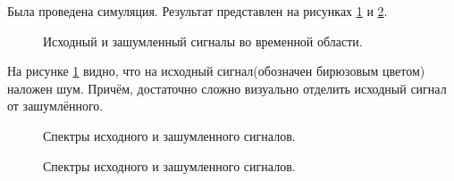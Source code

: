 \documentclass[a4paper,14pt]{extarticle}
\begin{document}
Была проведена симуляция. Результат представлен на рисунках \ref{004} и \ref{005}.

\begin{figure}[H]
\caption{Исходный и зашумленный сигналы во временной области.}
\label{004}
\end{figure}

На рисунке \ref{004} видно, что на исходный сигнал(обозначен бирюзовым цветом) наложен шум. Причём, достаточно сложно визуально отделить исходный сигнал от зашумлённого.

\begin{figure}[H]
\caption{Спектры исходного и зашумленного сигналов.}
\label{005}
\end{figure}

\begin{figure}[H]
\caption{Спектры исходного и зашумленного сигналов.}
\label{005_1}
\end{figure}
\end{document}
